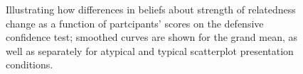 \documentclass[manuscript,screen,review,anonymous]{acmart}
\begin{document}
\begin{figure}


\caption{\label{fig-dc-smooth}Illustrating how differences in beliefs
about strength of relatedness change as a function of partcipants'
scores on the defensive confidence test; smoothed curves are shown for
the grand mean, as well as separately for atypical and typical
scatterplot presentation conditions.}

\end{figure}%
\end{document}
